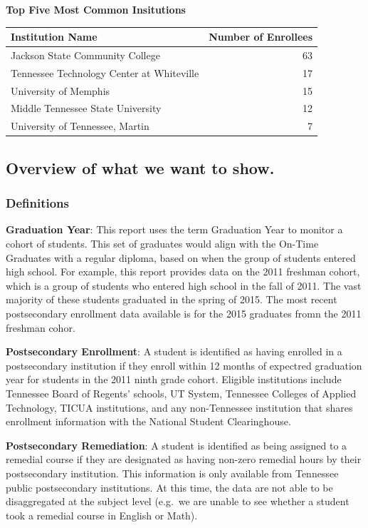 \documentclass[11pt,]{article}
\begin{document}
\textbf{Top Five Most Common Insitutions}

\begin{longtable}[]{@{}lr@{}}
\toprule
Institution Name & Number of Enrollees\tabularnewline
\midrule
\endhead
Jackson State Community College & 63\tabularnewline
Tennessee Technology Center at Whiteville & 17\tabularnewline
University of Memphis & 15\tabularnewline
Middle Tennessee State University & 12\tabularnewline
University of Tennessee, Martin & 7\tabularnewline
\bottomrule
\end{longtable}

\subsection{Overview of what we want to
show.}\label{overview-of-what-we-want-to-show.}

\newpage

\subsubsection{Definitions}\label{definitions}

\textbf{Graduation Year}: This report uses the term Graduation Year to
monitor a cohort of students. This set of graduates would align with the
On-Time Graduates with a regular diploma, based on when the group of
students entered high school. For example, this report provides data on
the 2011 freshman cohort, which is a group of students who entered high
school in the fall of 2011. The vast majority of these students
graduated in the spring of 2015. The most recent postsecondary
enrollment data available is for the 2015 graduates fromn the 2011
freshman cohor.

\textbf{Postsecondary Enrollment}: A student is identified as having
enrolled in a postsecondary institution if they enroll within 12 months
of expectred graduation year for students in the 2011 ninth grade
cohort. Eligible institutions include Tennessee Board of Regents'
schools, UT System, Tennessee Colleges of Applied Technology, TICUA
institutions, and any non-Tennessee institution that shares enrollment
information with the National Student Clearinghouse.

\textbf{Postsecondary Remediation}: A student is identified as being
assigned to a remedial course if they are designated as having non-zero
remedial hours by their postsecondary institution. This information is
only available from Tennessee public postsecondary institutions. At this
time, the data are not able to be disaggregated at the subject level
(e.g.~we are unable to see whether a student took a remedial course in
English or Math).
\end{document}
